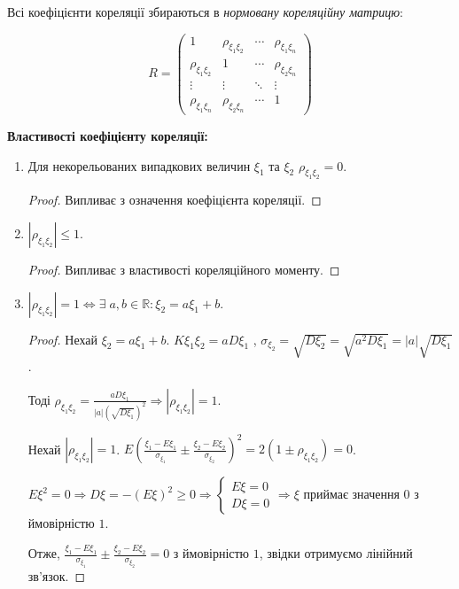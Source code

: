 \begin{definition}
    Всі коефіцієнти кореляції збираються в 
    \emph{нормовану кореляційну матрицю}:

    \begin{equation*}
        R = 
        \begin{pmatrix}
            1 & \rho_{\xi_1\xi_2} & \cdots & \rho_{\xi_1\xi_n} \\
            \rho_{\xi_1\xi_2} & 1 & \cdots & \rho_{\xi_2\xi_n} \\
            \vdots & \vdots & \ddots & \vdots \\
            \rho_{\xi_1\xi_n} & \rho_{\xi_2\xi_n} & \cdots & 1
        \end{pmatrix}
    \end{equation*}

\end{definition}

\noindent \textbf{Властивості коефіцієнту кореляції:}
\begin{enumerate}
    \item Для некорельованих випадкових величин $\xi_1$ та $\xi_2$ 
    $\rho_{\xi_1\xi_2} = 0$.
    \begin{proof}
        Випливає з означення коефіцієнта кореляції.
    \end{proof}
    \item $\left|\rho_{\xi_1\xi_2}\right| \leq 1$.
    \begin{proof}
        Випливає з властивості кореляційного моменту.
    \end{proof}
    \item $\left|\rho_{\xi_1\xi_2}\right| = 1 \Leftrightarrow 
    \exists \; a, b \in \mathbb{R}: \xi_2 = a\xi_1 + b$.
    \begin{proof}
        Нехай 
        $\xi_2 = a\xi_1 + b$. $K\xi_1\xi_2 = 
        aD\xi_1$
        , 
        $\sigma_{\xi_2} = \sqrt{D\xi_2} = \sqrt{a^2D\xi_1} = 
        |a|\sqrt{D\xi_1}$.

        Тоді $\rho_{\xi_1\xi_2} = \frac{aD\xi_1}{|a|(\sqrt{D\xi_1})^2} 
        \Rightarrow
        \left|\rho_{\xi_1\xi_2}\right| = 1$.

        Нехай $\left|\rho_{\xi_1\xi_2}\right| = 1$.
        $E\left(\frac{\xi_1 - E\xi_1}{\sigma_{\xi_1}} 
        \pm \frac{\xi_2 - E\xi_2}{\sigma_{\xi_2}}\right)^2 = 
        2(1\pm\rho_{\xi_1\xi_2}) = 0$.

        $E\xi^2 = 0 \Rightarrow D\xi = -(E\xi)^2 \geq 0 \Rightarrow \begin{cases}
            E\xi = 0 \\ D\xi = 0
        \end{cases} \Rightarrow \xi$ приймає значення $0$ з ймовірністю $1$.

        Отже, $\frac{\xi_1 - E\xi_1}{\sigma_{\xi_1}} 
        \pm \frac{\xi_2 - E\xi_2}{\sigma_{\xi_2}} = 0$ з ймовірністю $1$,
        звідки отримуємо лінійний зв'язок.
    \end{proof}
\end{enumerate}